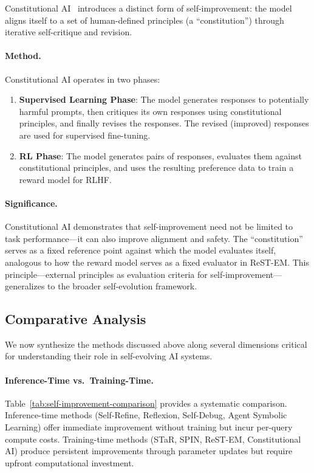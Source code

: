 Constitutional AI~\citep{bai2022constitutional} introduces a distinct form of self-improvement: the model aligns itself to a set of human-defined principles (a ``constitution'') through iterative self-critique and revision.

\paragraph{Method.}
Constitutional AI operates in two phases:
\begin{enumerate}
    \item \textbf{Supervised Learning Phase}: The model generates responses to potentially harmful prompts, then critiques its own responses using constitutional principles, and finally revises the responses. The revised (improved) responses are used for supervised fine-tuning.
    \item \textbf{RL Phase}: The model generates pairs of responses, evaluates them against constitutional principles, and uses the resulting preference data to train a reward model for RLHF.
\end{enumerate}

\paragraph{Significance.}
Constitutional AI demonstrates that self-improvement need not be limited to task performance---it can also improve alignment and safety. The ``constitution'' serves as a fixed reference point against which the model evaluates itself, analogous to how the reward model serves as a fixed evaluator in ReST-EM. This principle---external principles as evaluation criteria for self-improvement---generalizes to the broader self-evolution framework.

\subsection{Comparative Analysis}
\label{sec:comparison}

We now synthesize the methods discussed above along several dimensions critical for understanding their role in self-evolving AI systems.

\paragraph{Inference-Time vs.\ Training-Time.}
Table~\ref{tab:self-improvement-comparison} provides a systematic comparison. Inference-time methods (Self-Refine, Reflexion, Self-Debug, Agent Symbolic Learning) offer immediate improvement without training but incur per-query compute costs. Training-time methods (STaR, SPIN, ReST-EM, Constitutional AI) produce persistent improvements through parameter updates but require upfront computational investment.

